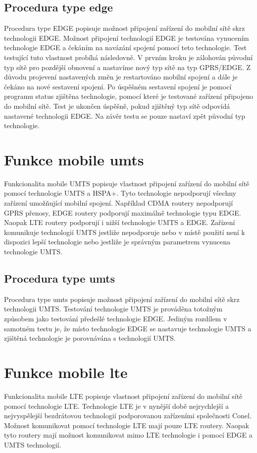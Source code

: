 \subsection{Procedura type edge}
Procedura type EDGE popisuje možnost připojení zařízení do mobilní sítě skrz technologii EDGE. Možnost připojení technologií EDGE je testována vynucením technologie EDGE a čekáním na navázání spojení pomocí teto technologie. Test testující tuto vlastnost probíhá následovně. V prvním kroku je zálohován původní typ sítě pro pozdější obnovení a nastavíme nový typ sítě na typ GPRS/EDGE. Z důvodu projevení nastavených změn je restartováno mobilní spojení a dále je čekáno na nové sestavení spojení. Po úspěšném sestavení spojení je pomocí programu status zjištěna technologie, pomocí které je testované zařízení připojeno do mobilní sítě. Test je ukončen úspěšně, pokud zjištěný typ sítě odpovídá nastavené technologii EDGE. Na závěr testu se pouze nastaví zpět původní typ technologie.

\section{Funkce mobile umts}
Funkcionalita mobile UMTS popisuje vlastnost připojení zařízení do mobilní sítě pomocí technologie UMTS a HSPA+. Tyto technologie nepodporují všechny zařízení umožňující mobilní spojení. Například CDMA routery nepodporují GPRS přenosy, EDGE routery podporují maximálně technologie typu EDGE. Naopak LTE routery podporují i nižší technologie UMTS a EDGE. Zařízení komunikuje technologií UMTS jestliže nepodporuje nebo v místě použití není k dispozici lepší technologie nebo jestliže je správným parametrem vynucena technologie UMTS.

\subsection{Procedura type umts}
Procedura type umts popisuje možnost připojení zařízení do mobilní sítě skrz technologii UMTS. Testování technologie UMTS je prováděna totožným způsobem jako testování předešlé technologie EDGE. Jediným rozdílem v samotném testu je, že místo technologie EDGE se nastavuje technologie UMTS a zjištěná technologie je porovnávána s technologií UMTS.

\section{Funkce mobile lte}
Funkcionalita mobile LTE popisuje vlastnost připojení zařízení do mobilní sítě pomocí technologie LTE. Technologie LTE je v nynější době nejrychlejší a nejvyspělejší bezdrátovou technologií podporovanou zařízeními společnosti Conel. Možnost komunikovat pomocí technologie LTE mají pouze LTE routery. Naopak tyto routery mají možnost komunikovat mimo LTE technologie i pomocí EDGE a UMTS technologií.

